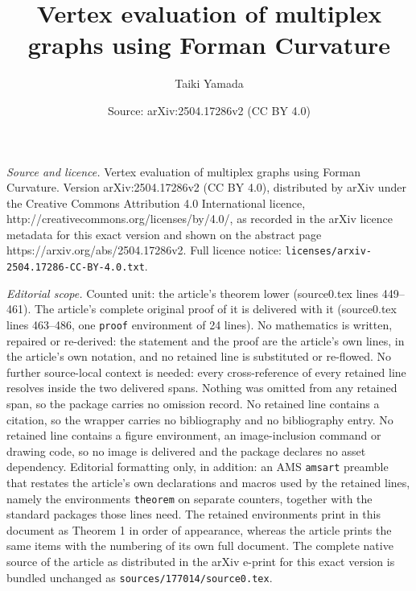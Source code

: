 \documentclass[10pt,a4paper]{amsart}
\title{Vertex evaluation of multiplex graphs using Forman Curvature}
\author{Taiki Yamada}
\date{Source: arXiv:2504.17286v2 (CC BY 4.0)}
\begin{document}
\maketitle

\noindent\emph{Source and licence.} Vertex evaluation of multiplex graphs using Forman Curvature. Version arXiv:2504.17286v2 (CC BY 4.0), distributed by arXiv under the Creative Commons Attribution 4.0 International licence, http://creativecommons.org/licenses/by/4.0/, as recorded in the arXiv licence metadata for this exact version and shown on the abstract page https://arxiv.org/abs/2504.17286v2. Full licence notice: \texttt{licenses/arxiv-2504.17286-CC-BY-4.0.txt}.\par\smallskip

\noindent\textit{Editorial scope.} Counted unit: the article's theorem lower (source0.tex lines 449--461). The article's complete original proof of it is delivered with it (source0.tex lines 463--486, one \texttt{proof} environment of 24 lines). No mathematics is written, repaired or re-derived: the statement and the proof are the article's own lines, in the article's own notation, and no retained line is substituted or re-flowed.  No further source-local context is needed: every cross-reference of every retained line resolves inside the two delivered spans.  Nothing was omitted from any retained span, so the package carries no omission record.  No retained line contains a citation, so the wrapper carries no bibliography and no bibliography entry.  No retained line contains a figure environment, an image-inclusion command or drawing code, so no image is delivered and the package declares no asset dependency.  Editorial formatting only, in addition: an AMS \texttt{amsart} preamble that restates the article's own declarations and macros used by the retained lines, namely the environments \texttt{theorem} on separate counters, together with the standard packages those lines need.  The retained environments print in this document as Theorem 1 in order of appearance, whereas the article prints the same items with the numbering of its own full document.  The complete native source of the article as distributed in the arXiv e-print for this exact version is bundled unchanged as \texttt{sources/177014/source0.tex}.
\end{document}
